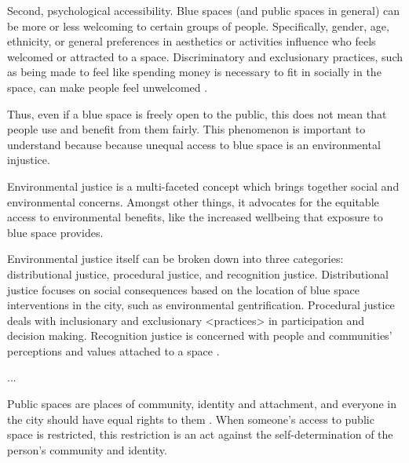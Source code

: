 \documentclass{article}
\begin{document}
Second, psychological accessibility. Blue spaces (and public spaces in general) can be more or less welcoming to certain groups of people. Specifically, gender, age, ethnicity, or general preferences in aesthetics or activities influence who feels welcomed or attracted to a space. Discriminatory and exclusionary practices, such as being made to feel like  spending money is necessary to fit in socially in the space, can make people feel unwelcomed \parencite{???}.


Thus, even if a blue space is freely open to the public, this does not mean that people use and benefit from them fairly. 
This phenomenon is important to understand because because unequal access to blue space is an environmental injustice.


Environmental justice is a multi-faceted concept which brings together social and environmental concerns. Amongst other things, it advocates for the equitable access to environmental benefits, like the increased wellbeing that exposure to blue space provides.

Environmental justice itself can be broken down into three categories: distributional justice, procedural justice, and recognition justice. 
Distributional justice focuses on social consequences based on the location of blue space interventions in the city, such as environmental gentrification.
Procedural justice deals with inclusionary and exclusionary <practices> in participation and decision making.
Recognition justice is concerned with people and communities' perceptions and values attached to a space \parencite{anguelovski2020expanding}.

...

Public spaces are places of community, identity and attachment, and everyone in the city should have equal rights to them \parencite{agyeman2016trends}. When someone's access to public space is restricted, this restriction is an act against the self-determination of the person's community and identity.


\end{document}
